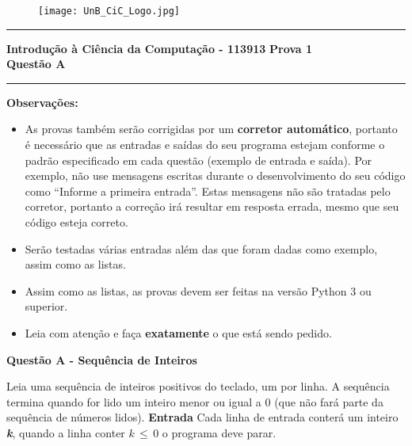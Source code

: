 \documentclass[a4paper, 12pt]{article}
\begin{document}
\begin{figure}[H]
	\texttt{[image: UnB\_CiC\_Logo.jpg]}
\end{figure}
\noindent\rule{\textwidth}{0.4pt}
\begin{center}
	\textbf{{\Large Introdução à Ciência da Computação - 113913}} \newline \newline
	\textbf{{\large Prova 1} \\
	\vspace{9pt}
	{\large Questão A}} \\
	\noindent\rule{\textwidth}{0.4pt}
	\newline
\end{center}

\textbf{{\large Observações:}}
\begin{itemize}
	\item As provas também serão corrigidas por um \textbf{corretor automático}, portanto é necessário que as entradas e saídas do seu programa estejam conforme o padrão especificado em cada questão (exemplo de entrada e saída). Por exemplo, não use mensagens escritas durante o desenvolvimento do seu código como “Informe a primeira entrada”. Estas mensagens não são tratadas pelo corretor, portanto a correção irá resultar em resposta errada, mesmo que seu código esteja correto.
	\item Serão testadas várias entradas além das que foram dadas como exemplo, assim como as listas.
	\item Assim como as listas, as provas devem ser feitas na versão Python 3 ou superior.
	\item Leia com atenção e faça \textbf{exatamente} o que está sendo pedido.
\end{itemize}
\newpage %
\begin{center}
\textbf{{\Large Questão A - Sequência de Inteiros}}
\end{center}
\vspace{5pt}
Leia uma sequência de inteiros positivos do teclado, um por linha. A sequência termina quando for lido um inteiro menor ou igual a 0 (que não fará parte da sequência de números lidos).
\newline \newline
\textbf{{\large Entrada}} \newline
Cada linha de entrada conterá um inteiro \textbf{\textit{k}}, quando a linha conter 
$k\, \leq \, 0$ o programa deve parar.
\newline \newline
\end{document}
